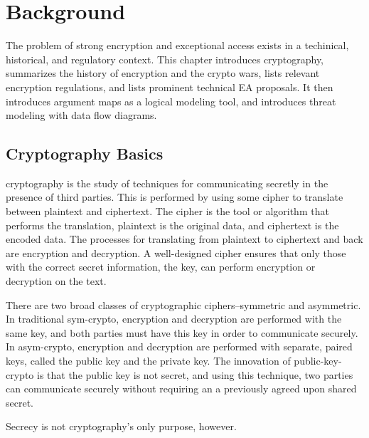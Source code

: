 \chapter{Background}
\label{chap-background}

The problem of strong encryption and exceptional access exists in a techinical, historical, and regulatory context. This
chapter introduces cryptography, summarizes the history of encryption and the crypto wars, lists relevant encryption
regulations, and lists prominent technical \ac{EA} proposals. It then introduces argument maps as a logical modeling
tool, and introduces threat modeling with data flow diagrams.



\section{Cryptography Basics}
\label{sec-crypto-basics}

\Ac{cryptography} is the study of techniques for communicating secretly in the presence of third parties. This is
performed by using some \ac{cipher} to translate between \ac{plaintext} and \ac{ciphertext}. The cipher is the tool or
algorithm that performs the translation, plaintext is the original data, and ciphertext is the encoded data. The
processes for translating from plaintext to ciphertext and back are \ac{encryption} and \ac{decryption}. A well-designed
cipher ensures that only those with the correct secret information, the \ac{key}, can perform encryption or decryption
on the text.

There are two broad classes of cryptographic ciphers--symmetric and asymmetric. In traditional \ac{sym-crypto},
encryption and decryption are performed with the same key, and both parties must have this key in order to communicate
securely. In \ac{asym-crypto}, encryption and decryption are performed with separate, paired keys, called the public key
and the private key. The innovation of \ac{public-key-crypto} is that the public key is not secret, and using this
technique, two parties can communicate securely without requiring an a previously agreed upon shared secret.

Secrecy is not cryptography's only purpose, however.

